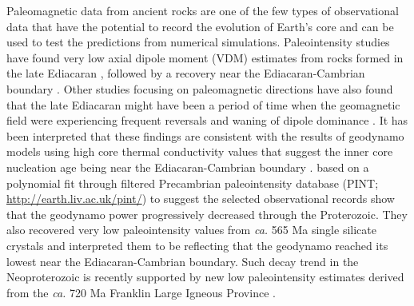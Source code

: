\documentclass[draft]{agujournal2019}
\begin{document}
Paleomagnetic data from ancient rocks are one of the few types of observational data that have the potential to record the evolution of Earth’s core and can be used to test the predictions from numerical simulations. Paleointensity studies have found very low axial dipole moment (VDM) estimates from rocks formed in the late Ediacaran \cite{Bono2019a, Shcherbakova2019a, Thallner2021b}, followed by a recovery near the Ediacaran-Cambrian boundary \cite{Thallner2021a}. Other studies focusing on paleomagnetic directions have also found that the late Ediacaran might have been a period of time when the geomagnetic field were experiencing frequent reversals and waning of dipole dominance \cite{Bono2015a, Kodama2020a}. It has been interpreted that these findings are consistent with the results of geodynamo models using high core thermal conductivity values that suggest the inner core nucleation age being near the Ediacaran-Cambrian boundary \cite{Driscoll2016a, Davies2021a}.  based on a polynomial fit through filtered Precambrian paleointensity database (PINT; \url{http://earth.liv.ac.uk/pint/}) to suggest the selected observational records show that the geodynamo power progressively decreased through the Proterozoic. They also recovered very low paleointensity values from \textit{ca.} 565 Ma single silicate crystals and interpreted them to be reflecting that the geodynamo reached its lowest near the Ediacaran-Cambrian boundary. Such decay trend in the Neoproterozoic is recently supported by new low paleointensity estimates derived from the \textit{ca.} 720 Ma Franklin Large Igneous Province \cite{Lloyd2021a}. 
\end{document}
